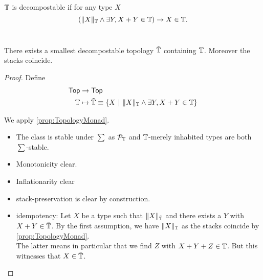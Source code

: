 \begin{definition}
	$\mathbb{T}$ is decompostable if for any type $X$
	\[ \left(\|X\|_{\mathbb{T}} \land \exists Y , X + Y \in \mathbb{T}  \right) \to X \in \mathbb{T}. \]\\ 

\end{definition}

\begin{prop}
	There exists a smallest decompostable topology $\tilde {\mathbb{T}}$ containing $\mathbb{T}$. Moreover the stacks coincide.	
\end{prop}
\begin{proof}
	Define
\begin{align*}
	\Top &\to \Top \\
	\bT &\mapsto \tilde \bT \equiv \{X \ | \ \|X\|_{\bT} \land \exists Y , X + Y \in \bT \} %
\end{align*}

	We apply \ref{prop:TopologyMonad}.
	\begin{itemize}
		\item 	The class is stable under $\sum$  as $\mathcal{P}_{\mathbb{T}}$ and $\mathbb{T}$-merely inhabited types are both  $\sum$-stable. \\
		\item Monotonicity clear.
		\item Inflationarity clear
		\item stack-preservation is clear by construction.
	\item idempotency: %
Let $X$ be a type such that $\|X\|_{\tilde {\mathbb{T}}}$ and there exists a $Y$  with $X + Y \in \tilde {\mathbb{T}}$. By the first assumption, we have $\|X\|_{\mathbb{T}}$ as the stacks coincide by \ref{prop:TopologyMonad}. \\
The latter means in particular that we find $Z$ with $X + Y + Z \in \mathbb{T}$. But this witnesses that $X  \in \tilde {\mathbb{T}}$.		
\end{itemize}

\end{proof}




